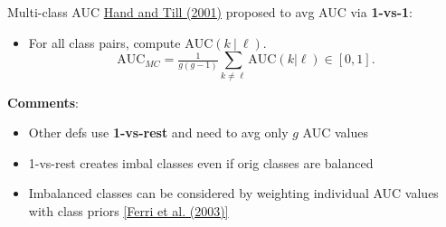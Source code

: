 \begin{vbframe}{Multi-class AUC}
\href{https://link.springer.com/article/10.1023/A:1010920819831}{Hand and Till (2001)} proposed to avg AUC via \textbf{1-vs-1}:

\begin{itemize}
    \item For all class pairs, 
        compute $\text{AUC}(k ~|~ \ell)$.
    $$\text{AUC}_{MC} = \tfrac{1}{g(g - 1)} \sum_{k \neq \ell} \text{AUC}(k | \ell) \in [0, 1].$$
\end{itemize}

\lz

\textbf{Comments}:

\begin{itemize}
\item Other defs use \textbf{1-vs-rest} and need to avg only $g$ AUC values
\item 1-vs-rest creates imbal classes even if orig classes are balanced
\item Imbalanced classes can be considered by weighting individual AUC values with class priors \href{https://doi.org/10.1016/j.patrec.2008.08.010}{[Ferri et al. (2003)]}
\end{itemize}

\end{vbframe}

